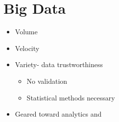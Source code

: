 \documentclass[12pt]{article}
\begin{document}
	\section*{Big Data}
		\begin{itemize}
			\item
				Volume
			\item
				Velocity
			\item
				Variety- data trustworthiness
				\begin{itemize}
					\item
						No validation
					\item
						Statistical methods necessary
				\end{itemize}
			\item
				Geared toward analytics and 

		\end{itemize}
\end{document}
